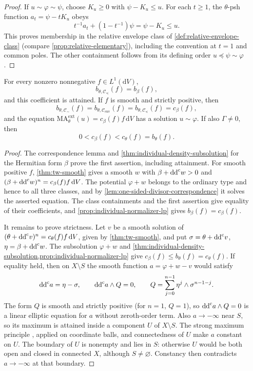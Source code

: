 \begin{proof}
If $u\sim\varphi\sim\psi$, choose $K_u\ge0$ with $\psi-K_u\le u$. For each $t\ge1$, the $\theta$-psh function $a_t=\psi-tK_u$ obeys
\[
 t^{-1}a_t+(1-t^{-1})\psi=\psi-K_u\le u.
\]
This proves membership in the relative envelope class of \cref{def:relative-envelope-class} (compare \cref{prop:relative-elementary}), including the convention at $t=1$ and common poles. The other containment follows from its defining order $u\preceq\psi\sim\varphi$.
\end{proof}

\begin{theorem}\label{thm:divisorial-type-thresholds}
For every nonzero nonnegative $f\in L^1(\mathrm dV)$,
\[
 b_{\theta,\mathcal C_{\preceq}}(f)=b_\beta(f),
\]
and this coefficient is attained. If $f$ is smooth and strictly positive, then
\[
 b_{\theta,\mathcal C_{\sim}}(f)
 =b_{\theta,\mathcal C_{\mathrm{env}}}(f)
 =b_{\theta,\mathcal C_{\preceq}}(f)=c_\beta(f),
\]
and the equation $\mathrm{MA}^{\mathrm{ext}}_\theta(u)=c_\beta(f)f\,\mathrm dV$ has a solution $u\sim\varphi$. If also $\Gamma\ne0$, then
\[
 0<c_\beta(f)<c_\theta(f)=b_\theta(f).
\]
\end{theorem}
\begin{proof}
The correspondence lemma and \cref{thm:individual-density-subsolution} for the Hermitian form $\beta$ prove the first assertion, including attainment.
For smooth positive $f$, \cref{thm:tw-smooth} gives a smooth $w$ with $\beta+\mathrm{dd}^{\mathrm{c}} w>0$ and
$(\beta+\mathrm{dd}^{\mathrm{c}} w)^n=c_\beta(f)f\,\mathrm dV$.
The potential $\varphi+w$ belongs to the ordinary type and hence to all three classes, and by \cref{lem:one-sided-divisor-correspondence} it solves the asserted equation. The class containments and the first assertion give equality of their coefficients, and \cref{prop:individual-normalizer-lp} gives $b_\beta(f)=c_\beta(f)$.

It remains to prove strictness. Let $v$ be a smooth solution of $(\theta+\mathrm{dd}^{\mathrm{c}} v)^n=c_\theta(f)f\,\mathrm dV$, given by \cref{thm:tw-smooth}, and put
$\sigma=\theta+\mathrm{dd}^{\mathrm{c}} v$, $\eta=\beta+\mathrm{dd}^{\mathrm{c}} w$.
The subsolution $\varphi+w$ and \cref{thm:individual-density-subsolution,prop:individual-normalizer-lp} give $c_\beta(f)\le b_\theta(f)=c_\theta(f)$. If equality held, then on $X\setminus S$ the smooth function $a=\varphi+w-v$ would satisfy
\[
 \mathrm{dd}^{\mathrm{c}} a=\eta-\sigma,\qquad
 \mathrm{dd}^{\mathrm{c}} a\wedge Q=0,\qquad
 Q=\sum_{j=0}^{n-1}\eta^j\wedge\sigma^{n-1-j}.
\]
The form $Q$ is smooth and strictly positive (for $n=1$, $Q=1$), so $\mathrm{dd}^{\mathrm{c}} a\wedge Q=0$ is a linear elliptic equation for $a$ without zeroth-order term. Also $a\to-\infty$ near $S$, so its maximum is attained inside a component $U$ of $X\setminus S$. The strong maximum principle \cite[Theorem~3.5]{GT01}, applied on coordinate balls, and connectedness of $U$ make $a$ constant on $U$.
The boundary of $U$ is nonempty and lies in $S$: otherwise $U$ would be both open and closed in connected $X$, although $S\ne\varnothing$. Constancy then contradicts $a\to-\infty$ at that boundary.
\end{proof}

